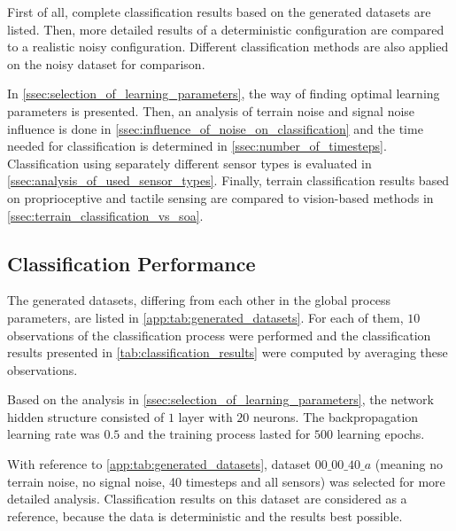 First of all, complete classification results based on the generated datasets are listed. Then, more detailed results of a deterministic configuration are  compared to a realistic noisy configuration. Different classification methods are also applied on the noisy dataset for comparison.

In \cref{ssec:selection_of_learning_parameters}, the way of finding optimal learning parameters is presented. Then, an analysis of terrain noise and signal noise influence is done in \cref{ssec:influence_of_noise_on_classification} and the time needed for classification is determined in \cref{ssec:number_of_timesteps}. Classification using separately different sensor types is evaluated in \cref{ssec:analysis_of_used_sensor_types}. Finally, terrain classification results based on proprioceptive and tactile sensing are compared to vision-based methods in \cref{ssec:terrain_classification_vs_soa}.

\subsection{Classification Performance} \label{ssec:classification_performance}
The generated datasets, differing from each other in the global process parameters, are listed in \cref{app:tab:generated_datasets}. For each of them, $ 10 $ observations of the classification process were performed and the classification results presented in \cref{tab:classification_results} were computed by averaging these observations.

Based on the analysis in \cref{ssec:selection_of_learning_parameters}, the network hidden structure consisted of $ 1 $ layer with $ 20 $ neurons. The backpropagation learning rate was $ 0.5 $ and the training process lasted for $ 500 $ learning epochs.

With reference to \cref{app:tab:generated_datasets}, dataset $ 00\_00\_40\_a $ (meaning no terrain noise, no signal noise, 40 timesteps and all sensors) was selected for more detailed analysis. Classification results on this dataset are considered as a reference, because the data is deterministic and the results best possible.

